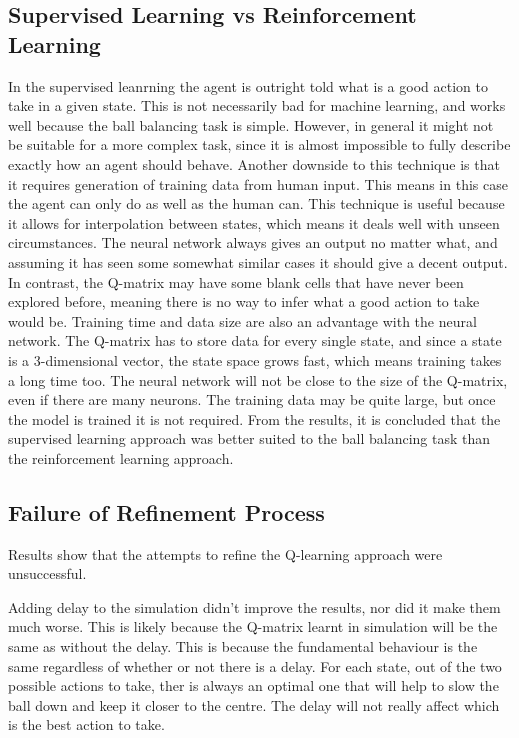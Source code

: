 \documentclass[12pt,a4paper]{article}
\begin{document}
\subsection{Supervised Learning vs Reinforcement Learning}
In the supervised leanrning the agent is outright told what is a good action to take in a given state. This is not necessarily bad for machine learning, and works well because the ball balancing task is simple. However, in general it might not be suitable for a more complex task, since it is almost impossible to fully describe exactly how an agent should behave. Another downside to this technique is that it requires generation of training data from human input. This means in this case the agent can only do as well as the human can. 
This technique is useful because it allows for interpolation between states, which means it deals well with unseen circumstances. The neural network always gives an output no matter what, and assuming it has seen some somewhat similar cases it should give a decent output. In contrast, the Q-matrix may have some blank cells that have never been explored before, meaning there is no way to infer what a good action to take would be. Training time and data size are also an advantage with the neural network. The Q-matrix has to store data for every single state, and since a state is a 3-dimensional vector, the state space grows fast, which means training takes a long time too. The neural network will not be close to the size of the Q-matrix, even if there are many neurons. The training data may be quite large, but once the model is trained it is not required. 
From the results, it is concluded that the supervised learning approach was better suited to the ball balancing task than the reinforcement learning approach. 

\subsection{Failure of Refinement Process}
Results show that the attempts to refine the Q-learning approach were unsuccessful.

Adding delay to the simulation didn't improve the results, nor did it make them much worse. This is likely because the Q-matrix learnt in simulation will be the same as without the delay. This is because the fundamental behaviour is the same regardless of whether or not there is a delay. For each state, out of the two possible actions to take, ther is always an optimal one that will help to slow the ball down and keep it closer to the centre. The delay will not really affect which is the best action to take.
\end{document}
